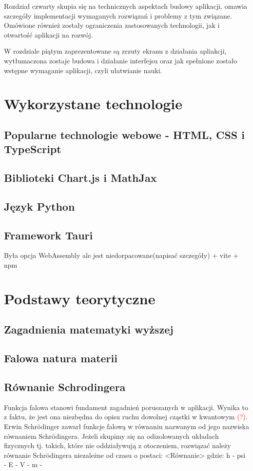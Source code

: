 \documentclass{SGGW-thesis}
\begin{document}
	Rozdział czwarty skupia się na technicznych aspektach budowy aplikacji, omawia szczegóły implementacji wymaganych rozwiązań i problemy z tym związane. Omówione również zostały ograniczenia zastosowanych technologii, jak i otwartość aplikacji na rozwój.
	
	W rozdziale piątym zaprezentowane są zrzuty ekranu z działania apliakcji, wytłumaczona zostaje budowa i działanie interfejsu oraz jak spełnione zostało wstępne wymaganie aplikacji, czyli ułatwianie nauki.
	
	
\chapter{Wykorzystane technologie}
	\section{Popularne technologie webowe - HTML, CSS i TypeScript}
	\section{Biblioteki Chart.js i MathJax}
	\section{Język Python}
	\section{Framework Tauri}
	Była opcja WebAssembly ale jest niedorpacowane(napisać szczegóły)
	+ vite + npm
	
\chapter{Podstawy teorytyczne}
	\section{Zagadnienia matematyki wyższej}
	\section{Falowa natura materii}
	\section{Równanie Schrodingera}
	Funkcja falowa stanowi fundament zagadnień poruszanych w aplikacji. Wynika to z faktu, że jest ona niezbędna do opisu ruchu dowolnej cząstki w kwantowym \textcolor{red}{(?)}. Erwin Schrödinger zawarł funkcje falową w równaniu nazwanym od jego nazwiska równaniem Schrödingera. Jeżeli skupimy się na odizolowanych układach fizycznych tj. takich, które nie oddziaływują z otoczeniem, rozwiązać należy równanie Schrödingera niezależne od czasu o postaci:
	<Równanie>
	gdzie:
	h - 
	psi - 
	E - 
	V - 
	m - 
	
\end{document}

